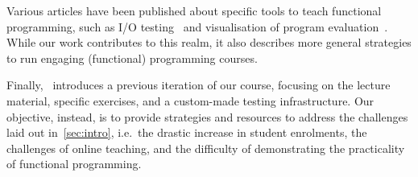 Various articles have been published about
specific tools to teach functional programming,
such as I/O testing~\cite{iotest2}
and visualisation of program evaluation~\cite{steppingocaml}.
While our work contributes to this realm,
it also describes more general strategies
to run engaging (functional) programming courses.

Finally,~\cite{next_1100}
introduces a previous iteration of our course,
focusing on the lecture material,
specific exercises, and a custom-made testing infrastructure.
Our objective, instead, is to provide strategies and resources to address
the challenges laid out in~\cref{sec:intro},
i.e.\ the drastic increase in student enrolments,
the challenges of online teaching,
and the difficulty of demonstrating the practicality of functional programming.
